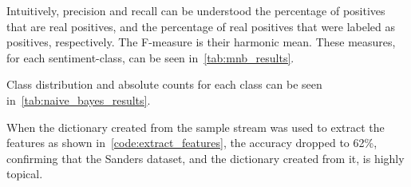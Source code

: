Intuitively, precision and recall can be understood the percentage of positives that are real positives,
and the percentage of real positives that were labeled as positives, respectively.
The F-measure is their harmonic mean.
These measures, for each sentiment-class, can be seen in~\ref{tab:mnb_results}.

\begin{table}
    \caption{Sentiment classification results using multinomial naive Bayes}
    \label{tab:mnb_results}
\end{table}

Class distribution and absolute counts for each class can be seen in~\ref{tab:naive_bayes_results}.

\begin{table}
    \caption{Sentiment classification using multinomial naive Bayes}
    \label{tab:naive_bayes_results}
\end{table}

When the dictionary created from the sample stream was used to extract the features as shown in~\ref{code:extract_features},
the accuracy dropped to 62\%, confirming that the Sanders dataset, and the dictionary created from it, is highly topical.

